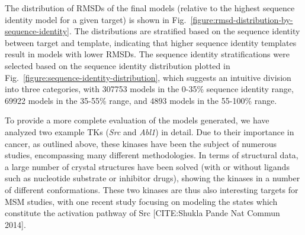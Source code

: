 \documentclass[aps,pre,twocolumn,nofootinbib,superscriptaddress,linenumbers]{revtex4-1}
\begin{document}
The distribution of RMSDs of the final models (relative to the highest sequence identity model for a given target) is shown in Fig.~\ref{figure:rmsd-distribution-by-sequence-identity}.
The distributions are stratified based on the sequence identity between target and template, indicating that higher sequence identity templates result in models with lower RMSDs.
The sequence identity stratifications were selected based on the sequence identity distribution plotted in Fig.~\ref{figure:sequence-identity-distribution}, which suggests an intuitive division into three categories, with \num{307753} models in the 0-35\% sequence identity range, \num{69922} models in the 35-55\% range, and \num{4893} models in the 55-100\% range. 

To provide a more complete evaluation of the models generated, we have analyzed two example TKs (\emph{Src} and \emph{Abl1}) in detail.
Due to their importance in cancer, as outlined above, these kinases have been the subject of numerous studies, encompassing many different methodologies.
In terms of structural data, a large number of crystal structures have been solved (with or without ligands such as nucleotide substrate or inhibitor drugs), showing the kinases in a number of different conformations.
These two kinases are thus also interesting targets for MSM studies, with one recent study focusing on modeling the states which constitute the activation pathway of Src {\color{blue}[CITE:Shukla Pande Nat Commun 2014]}.
\end{document}
